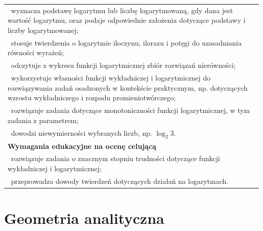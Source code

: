 \documentclass[12pt,a4paper]{article}
\begin{document}
\begin{longtable}{|p{16cm}|}
		\textbullet\ wyznacza podstawę logarytmu lub liczbę logarytmowaną, gdy dana jest wartość logarytmu, oraz podaje odpowiednie założenia dotyczące podstawy i liczby logarytmowanej; \\
		
		\textbullet\ stosuje twierdzenia o logarytmie iloczynu, ilorazu i potęgi do uzasadniania równości wyrażeń; \\
		
		\textbullet\ odczytuje z wykresu funkcji logarytmicznej zbiór rozwiązań nierówności; \\
		
		\textbullet\ wykorzystuje własności funkcji wykładniczej i logarytmicznej do rozwiązywania zadań osadzonych w kontekście praktycznym, np. dotyczących wzrostu wykładniczego i rozpadu promieniotwórczego; \\
		
		\textbullet\ rozwiązuje zadania dotyczące monotoniczności funkcji logarytmicznej, w tym zadania z parametrem; \\
		
		\textbullet\ dowodzi niewymierności wybranych liczb, np. $\log_2 3$. \\ \hline
		
		\textbf{Wymagania edukacyjne na ocenę celującą} \\ \hline
		
		\textbullet\ rozwiązuje zadania o znacznym stopniu trudności dotyczące funkcji wykładniczej i logarytmicznej; \\
		
		\textbullet\ przeprowadza dowody twierdzeń dotyczących działań na logarytmach. \\ \hline
		
	\end{longtable}
	
	\section{Geometria analityczna}
	
\end{document}
